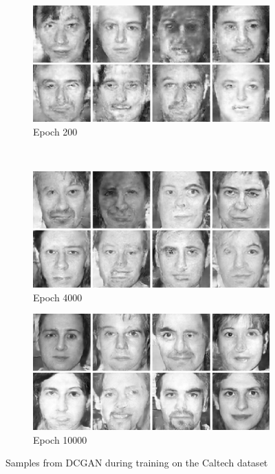 \begin{figure}
    \begin{subfigure}[b]{0.45\textwidth}
        \includegraphics[width=\textwidth]{fig/dcgan/caltech/epoch2000}
        \caption{Epoch 200}
    \end{subfigure}
    ~
    \begin{subfigure}[b]{0.45\textwidth}
        \includegraphics[width=\textwidth]{fig/dcgan/caltech/epoch4000}
        \caption{Epoch 4000}
    \end{subfigure}

    \begin{subfigure}[b]{\textwidth}
        \includegraphics[width=\textwidth]{fig/dcgan/caltech/epoch10000}
        \caption{Epoch 10000}
    \end{subfigure}
    \caption{Samples from DCGAN during training on the Caltech dataset}
    \label{dcgan-caltech-samples}
\end{figure}

